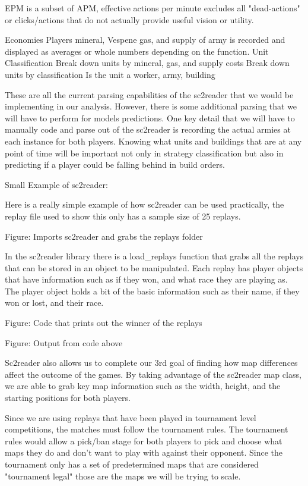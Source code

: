 \documentclass[a4paper,12pt]{report}
\begin{document}
EPM is a subset of APM, effective actions per minute excludes all "dead-actions" or clicks/actions that do not actually provide useful vision or utility.

Economies
Players mineral, Vespene gas, and supply of army is recorded and displayed as averages or whole numbers depending on the function. 
 Unit Classification
Break down units by mineral, gas, and supply costs
 Break down units by classification
Is the unit a worker, army, building

These are all the current parsing capabilities of the sc2reader that we would be implementing in our analysis. However, there is some additional parsing that we will have to perform for models predictions. One key detail that we will have to manually code and parse out of the sc2reader is recording the actual armies at each instance for both players. Knowing what units and buildings that are at any point of time will be important not only in strategy classification but also in predicting if a player could be falling behind in build orders.


Small Example of sc2reader:

Here is a really simple example of how sc2reader can be used practically, the replay file used to show this only has a sample size of 25 replays.

Figure: Imports sc2reader and grabs the replays folder

In the sc2reader library there is a load\_replays function that grabs all the replays that can be stored in an object to be manipulated. Each replay has player objects that have information such as if they won, and what race they are playing as. The player object holds a bit of the basic information such as their name, if they won or lost, and their race. 


Figure: Code that prints out the winner of the replays


Figure: Output from code above

Sc2reader also allows us to complete our 3rd goal of finding how map differences affect the outcome of the games. By taking advantage of the sc2reader map class, we are able to grab key map information such as the width, height, and the starting positions for both players.

Since we are using replays that have been played in tournament level competitions, the matches must follow the tournament rules. The tournament rules would allow a pick/ban stage for both players to pick and choose what maps they do and don’t want to play with against their opponent. Since the tournament only has a set of predetermined maps that are considered "tournament legal" those are the maps we will be trying to scale.
\end{document}
